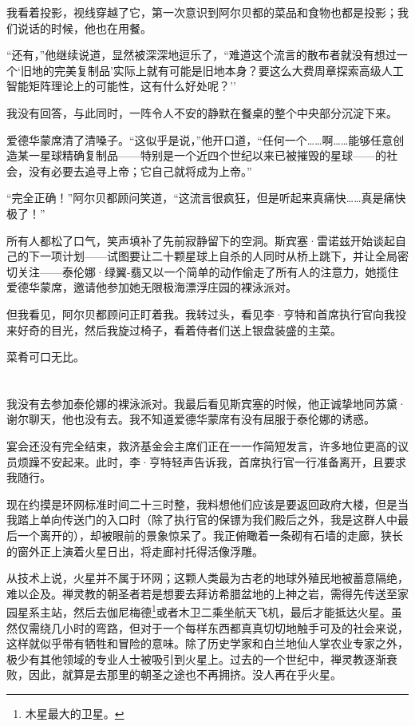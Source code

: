 \documentclass[AutoFakeBold=true]{book}
\begin{document}
我看着投影，视线{\kaishu 穿越}了它，第一次意识到阿尔贝都的菜品和食物也都是投影；我们说话的时候，他也在用餐。

``还有，''他继续说道，显然被深深地逗乐了，``难道这个流言的散布者就没有想过一个`旧地的完美复制品'实际上就有可能是旧地{\kaishu 本身}？要这么大费周章探索高级人工智能矩阵理论上的可能性，这有什么好处呢？''

我没有回答，与此同时，一阵令人不安的静默在餐桌的整个中央部分沉淀下来。

爱德华蒙席清了清嗓子。``这似乎是说，''他开口道，``任何一个……啊……能够任意创造某一星球精确复制品——特别是一个近四个世纪以来已被摧毁的星球——的社会，没有必要去追寻上帝；它自己就将{\kaishu 成为}上帝。''

``完全正确！''阿尔贝都顾问笑道，``这流言很疯狂，但是听起来真痛快……真是痛快极了！''

所有人都松了口气，笑声填补了先前寂静留下的空洞。斯宾塞·雷诺兹开始谈起自己的下一项计划——试图要让二十颗星球上自杀的人同时从桥上跳下，并让全局密切关注——泰伦娜·绿翼-翡又以一个简单的动作偷走了所有人的注意力，她揽住爱德华蒙席，邀请他参加她无限极海漂浮庄园的裸泳派对。

但我看见，阿尔贝都顾问正盯着我。我转过头，看见李·亨特和首席执行官向我投来好奇的目光，然后我旋过椅子，看着侍者们送上银盘装盛的主菜。

菜肴可口无比。

\chapter{}

我没有去参加泰伦娜的裸泳派对。我最后看见斯宾塞的时候，他正诚挚地同苏黛·谢尔聊天，他也没有去。我不知道爱德华蒙席有没有屈服于泰伦娜的诱惑。

宴会还没有完全结束，救济基金会主席们正在一一作简短发言，许多地位更高的议员烦躁不安起来。此时，李·亨特轻声告诉我，首席执行官一行准备离开，且要求我随行。

现在约摸是环网标准时间二十三时整，我料想他们应该是要返回政府大楼，但是当我踏上单向传送门的入口时（除了执行官的保镖为我们殿后之外，我是这群人中最后一个离开的），却被眼前的景象惊呆了。我正俯瞰着一条砌有石墙的走廊，狭长的窗外正上演着火星日出，将走廊衬托得活像浮雕。

从技术上说，火星并不属于环网；这颗人类最为古老的地球外殖民地被蓄意隔绝，难以企及。禅灵教的朝圣者若是想要去拜访希腊盆地的上神之岩，需得先传送至家园星系主站，然后去伽尼梅德\footnote{木星最大的卫星。}或者木卫二乘坐航天飞机，最后才能抵达火星。虽然仅需绕几小时的弯路，但对于一个每样东西都真真切切地触手可及的社会来说，这样就似乎带有牺牲和冒险的意味。除了历史学家和白兰地仙人掌农业专家之外，极少有其他领域的专业人士被吸引到火星上。过去的一个世纪中，禅灵教逐渐衰败，因此，就算是去那里的朝圣之途也不再拥挤。没人再在乎火星。
\end{document}
